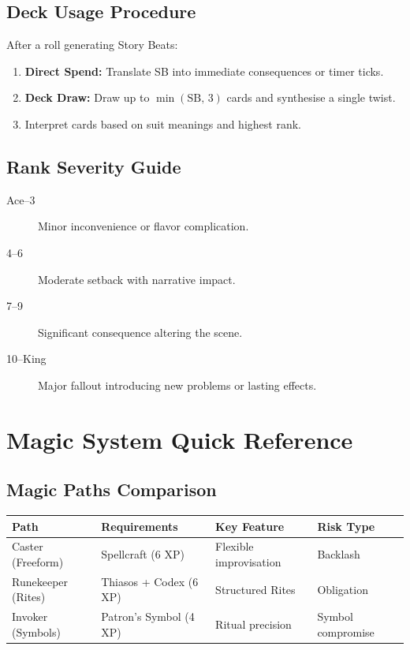 \subsection{Deck Usage Procedure}\label{subsec:deck_procedure}
After a roll generating Story Beats:
\begin{enumerate}
    \item \textbf{Direct Spend:} Translate SB into immediate consequences or timer ticks.
    \item \textbf{Deck Draw:} Draw up to \(\min(\text{SB},\,3)\) cards and synthesise a single twist.
    \item Interpret cards based on suit meanings and highest rank.
\end{enumerate}

\subsection{Rank Severity Guide}\label{subsec:rank_severity}
\begin{description}
    \item[Ace--3] Minor inconvenience or flavor complication.
    \item[4--6] Moderate setback with narrative impact.
    \item[7--9] Significant consequence altering the scene.
    \item[10--King] Major fallout introducing new problems or lasting effects.
\end{description}

\newpage
\section{Magic System Quick Reference}\label{sec:magic_reference}

\subsection{Magic Paths Comparison}\label{subsec:magic_paths_ref}

\begin{center}
\feTableStart
\begin{tabularx}{\linewidth}{@{}l l l l @{}}
\toprule
\textbf{Path} & \textbf{Requirements} & \textbf{Key Feature} & \textbf{Risk Type} \\
\midrule
Caster (Freeform) & Spellcraft (6 XP) & Flexible improvisation & Backlash \\
Runekeeper (Rites) & Thiasos + Codex (6 XP) & Structured Rites & Obligation \\
Invoker (Symbols) & Patron's Symbol (4 XP) & Ritual precision & Symbol compromise \\
\bottomrule
\end{tabularx}
\feTableEnd
\end{center}

